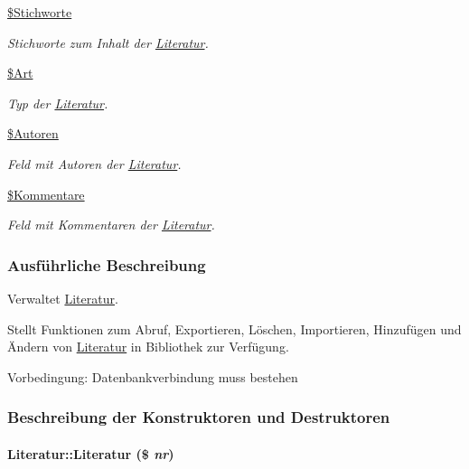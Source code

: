 \begin{CompactItemize}
\hyperlink{classLiteratur_aa77f0f697d4bcf72279aadedd91ddff}{\$Stichworte}
\begin{CompactList}\small\item\em Stichworte zum Inhalt der \hyperlink{classLiteratur}{Literatur}. \item\end{CompactList}\item 
\hyperlink{classLiteratur_fb4d4b1ce29a33a10e3e27d47f31a447}{\$Art}
\begin{CompactList}\small\item\em Typ der \hyperlink{classLiteratur}{Literatur}. \item\end{CompactList}\item 
\hyperlink{classLiteratur_01b311917d78c1dbb346435598ebba64}{\$Autoren}
\begin{CompactList}\small\item\em Feld mit Autoren der \hyperlink{classLiteratur}{Literatur}. \item\end{CompactList}\item 
\hyperlink{classLiteratur_ebcaeb5c38ce2677a14189da511fa663}{\$Kommentare}
\begin{CompactList}\small\item\em Feld mit Kommentaren der \hyperlink{classLiteratur}{Literatur}. \item\end{CompactList}\end{CompactItemize}


\subsubsection{Ausf\"{u}hrliche Beschreibung}
Verwaltet \hyperlink{classLiteratur}{Literatur}. 

Stellt Funktionen zum Abruf, Exportieren, Löschen, Importieren, Hinzufügen und Ändern von \hyperlink{classLiteratur}{Literatur} in Bibliothek zur Verfügung. \begin{Desc}
\item[Vorbedingung:]Datenbankverbindung muss bestehen \end{Desc}




\subsubsection{Beschreibung der Konstruktoren und Destruktoren}
\hypertarget{classLiteratur_55626b912da4c041eaf981781ed6c640}{
\paragraph[Literatur]{\setlength{\rightskip}{0pt plus 5cm}Literatur::Literatur (\$ {\em nr})}\hfill}
\label{classLiteratur_55626b912da4c041eaf981781ed6c640}


